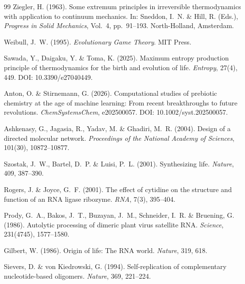 \documentclass[12pt,a4paper]{article}
\theoremstyle{remark}
\begin{document}
\begin{thebibliography}{99}
Ziegler, H. (1963).
\newblock Some extremum principles in irreversible thermodynamics with application to continuum mechanics.
\newblock In: Sneddon, I.~N. \& Hill, R. (Eds.), \textit{Progress in Solid Mechanics}, Vol.~4, pp.~91--193. North-Holland, Amsterdam.

Weibull, J.~W. (1995).
\newblock \textit{Evolutionary Game Theory}.
\newblock MIT Press.

Sawada, Y., Daigaku, Y. \& Toma, K. (2025).
\newblock Maximum entropy production principle of thermodynamics for the birth and evolution of life.
\newblock \textit{Entropy}, 27(4), 449.
\newblock DOI: 10.3390/e27040449.

Anton, O. \& Stirnemann, G. (2026).
\newblock Computational studies of prebiotic chemistry at the age of machine learning: From recent breakthroughs to future revolutions.
\newblock \textit{ChemSystemsChem}, e202500057.
\newblock DOI: 10.1002/syst.202500057.

Ashkenasy, G., Jagasia, R., Yadav, M. \& Ghadiri, M.~R. (2004).
\newblock Design of a directed molecular network.
\newblock \textit{Proceedings of the National Academy of Sciences}, 101(30), 10872--10877.

Szostak, J.~W., Bartel, D.~P. \& Luisi, P.~L. (2001).
\newblock Synthesizing life.
\newblock \textit{Nature}, 409, 387--390.

Rogers, J. \& Joyce, G.~F. (2001).
\newblock The effect of cytidine on the structure and function of an RNA ligase ribozyme.
\newblock \textit{RNA}, 7(3), 395--404.

Prody, G.~A., Bakos, J.~T., Buzayan, J.~M., Schneider, I.~R. \& Bruening, G. (1986).
\newblock Autolytic processing of dimeric plant virus satellite RNA.
\newblock \textit{Science}, 231(4745), 1577--1580.

Gilbert, W. (1986).
\newblock Origin of life: The RNA world.
\newblock \textit{Nature}, 319, 618.

Sievers, D. \& von Kiedrowski, G. (1994).
\newblock Self-replication of complementary nucleotide-based oligomers.
\newblock \textit{Nature}, 369, 221--224.


\end{thebibliography}
\end{document}
